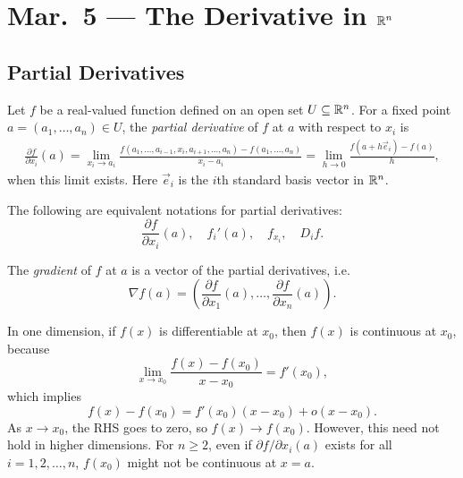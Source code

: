 \chapter{Mar.~5 --- The Derivative in \texorpdfstring{$\mathbb{R}^n$}{Rn}}

\section{Partial Derivatives}
\begin{definition}
  Let $f$ be a real-valued function defined on an
  open set $U \subseteq \mathbb{R}^n$. For a fixed point
  $a = (a_1, \dots, a_n) \in U$, the
  \emph{partial derivative} of $f$ at $a$ with
  respect to $x_i$ is
  \begin{align*}
    \frac{\partial f}{\partial x_i}(a)
    = \lim_{x_i \to a_i} \frac{f(a_1, \dots, a_{i-1}, x_i, a_{i+1}, \dots, a_n) - f(a_1, \dots, a_n)}{x_i - a_i}
    = \lim_{h \to 0} \frac{f(a + h \vec{e}_i) - f(a)}{h},
  \end{align*}
  when this limit exists. Here $\vec{e}_i$ is the
  $i$th standard basis vector in $\mathbb{R}^n$.
\end{definition}

\begin{remark}
  The following are equivalent notations for partial
  derivatives:
  \[
    \frac{\partial f}{\partial x_i}(a), \quad f_i'(a),
    \quad f_{x_i}, \quad D_i f
  .\]
\end{remark}

\begin{definition}
  The
  \emph{gradient} of $f$ at $a$ is a vector of the
  partial derivatives, i.e.
  \[
    \nabla f(a) = \left( \frac{\partial f}{\partial x_1}(a), \dots, \frac{\partial f}{\partial x_n}(a) \right).
  \]
\end{definition}

\begin{remark}
  In one dimension, if $f(x)$ is differentiable at $x_0$,
  then $f(x)$ is continuous at $x_0$, because
  \[
    \lim_{x \to x_0} \frac{f(x) - f(x_0)}{x - x_0} = f'(x_0),
  \]
  which implies
  \[
    f(x) - f(x_0) = f'(x_0)(x - x_0) + o(x - x_0).
  \]
  As $x \to x_0$, the RHS goes to zero, so
  $f(x) \to f(x_0)$. However, this need not hold
  in higher dimensions. For $n \ge 2$, even if
  $\partial f / \partial x_i (a)$ exists for all
  $i = 1, 2, \dots, n$, $f(x_0)$ might not be continuous
  at $x = a$.
\end{remark}

